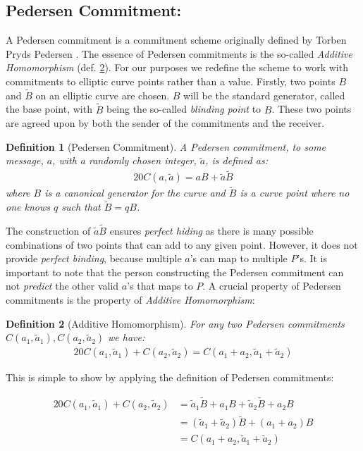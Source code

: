 \documentclass{article}
\newtheorem{definition}{Definition}[section]
\newcommand{\eq}[1]{\begin{alignat*}{20}#1\end{alignat*}}
\newcommand{\blind}[1]{\widetilde{#1}}
\newcommand{\ba}{\blind{a}}
\newcommand{\bB}{\blind{B}}
\begin{document}
\subsection{Pedersen Commitment:}

A Pedersen commitment is a commitment scheme originally defined by
Torben Pryds Pedersen \cite{pedersen}. The essence of Pedersen
commitments is the so-called \textit{Additive Homomorphism}
(def. \ref{pedersen-additive-homomorphism}). For our purposes we
redefine the scheme to work with commitments to elliptic curve points
rather than a value. Firstly, two points $B$ and $\bB$ on an elliptic
curve are chosen. $B$ will be the standard generator, called the
base point, with $\bB$ being the so-called \textit{blinding point}
to $B$. These two points are agreed upon by both the sender of the
commitments and the receiver.

\begin{definition}[Pedersen Commitment]
	A Pedersen commitment, to some message, $a$, with a randomly chosen
	integer, $\ba$, is defined as:
	\eq{
		C(a, \ba) = aB + \ba\bB
	}
	where $B$ is a canonical generator for the curve and $\bB$
	is a curve point where no one knows $q$ such that $\bB = qB$.
\end{definition}

The construction of $\ba\bB$ ensures \textit{perfect hiding} as there
is many possible combinations of two points that can add to any given
point. However, it does not provide \textit{perfect binding}, because
multiple $a$'s can map to multiple $P$'s. It is important to note that
the person constructing the Pedersen commitment can not \textit{predict}
the other valid $a$'s that maps to $P$. A crucial property of Pedersen
commitments is the property of \textit{Additive Homomorphism}:

\begin{definition}[Additive Homomorphism] \label{pedersen-additive-homomorphism}
	For any two Pedersen commitments $C(a_1,\ba_1), C(a_2,\ba_2)$ we have:
	\eq{
		C(a_1,\ba_1) + C(a_2,\ba_2) = C(a_1 + a_2, \ba_1 + \ba_2)
	}
\end{definition}

This is simple to show by applying the definition of Pedersen
commitments: 

\eq{
	C(a_1,\ba_1) + C(a_2,\ba_2) &= \ba_1\bB + a_1B  + \ba_2\bB + a_2B \\
	                            &= (\ba_1 + \ba_2)\bB + (a_1 + a_2)B \\
	                            &= C(a_1 + a_2, \ba_1 + \ba_2)
}
\end{document}
